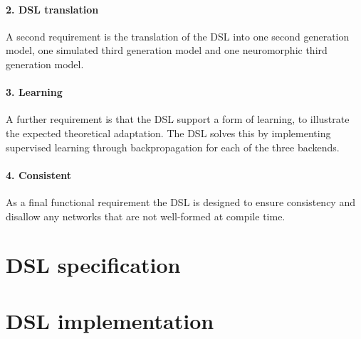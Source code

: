 \documentclass[report.tex]{subfiles}
\begin{document}
\paragraph{2. DSL translation}
A second requirement is the translation of the \gls{DSL} into
one second generation model, one simulated third generation model
and one neuromorphic third generation model.

\paragraph{3. Learning}
A further requirement is that the \gls{DSL} support a form of
learning, to illustrate the expected theoretical adaptation.
The \gls{DSL} solves this by implementing supervised 
learning through backpropagation  for each
of the three backends.

\paragraph{4. Consistent}
As a final functional requirement the \gls{DSL} is designed to ensure
consistency and disallow any networks that are not well-formed at
compile time.





\section{DSL specification} \label{ref:volr}


\section{DSL implementation} \label{ref:implementation}

\end{document}
